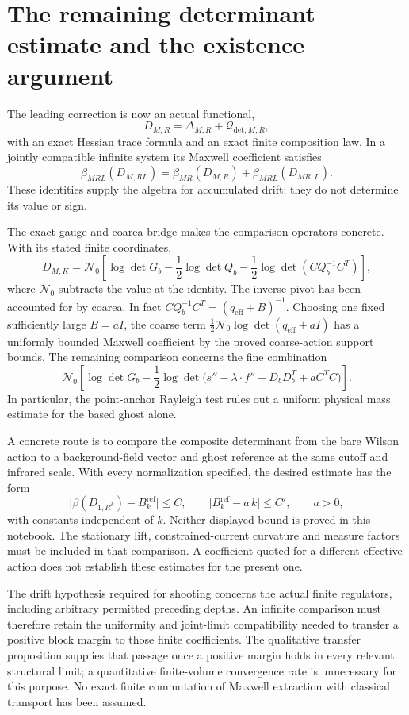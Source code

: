 \section{The remaining determinant estimate and the existence argument}
\label{dfn-next}

The leading correction is now an actual functional,
\[
 D_{M,R}=\Delta_{M,R}+\mathcal Q_{\mathrm{det},M,R},
\]
with an exact Hessian trace formula and an exact finite
composition law. In a jointly compatible infinite system its
Maxwell coefficient satisfies
\[
 \beta_{MRL}(D_{M,RL})
   =\beta_{MR}(D_{M,R})+\beta_{MRL}(D_{MR,L}).
\]
These identities supply the algebra for accumulated drift;
they do not determine its value or sign.

The exact gauge and coarea bridge makes the comparison
operators concrete. With its stated finite coordinates,
\[
 D_{M,K}=\mathcal N_0\!\left[
    \log\det G_b-\frac12\log\det Q_b
                 -\frac12\log\det(CQ_b^{-1}C^T)\right],
\]
where \(\mathcal N_0\) subtracts the value at the identity.
The inverse pivot has been accounted for by coarea.
In fact \(CQ_b^{-1}C^T=(q_{\mathrm{eff}}+B)^{-1}\).
Choosing one fixed sufficiently large \(B=aI\), the
coarse term \(\tfrac12\mathcal N_0\log\det(q_{\mathrm{eff}}+aI)\)
has a uniformly bounded Maxwell coefficient by the
proved coarse-action support bounds.
The remaining comparison concerns the fine combination
\[
 \mathcal N_0\!\left[
 \log\det G_b-\frac12\log\det
 \bigl(s''-\lambda\cdot f''+D_bD_b^T+aC^TC\bigr)\right].
\]
In particular, the point-anchor Rayleigh test rules out a
uniform physical mass estimate for the based ghost alone.

A concrete route is to compare the composite determinant from
the bare Wilson action to a background-field vector and ghost
reference at the same cutoff and infrared scale. With every
normalization specified, the desired estimate has the form
\[
 \bigl|\beta(D_{1,R^k})-B_k^{\mathrm{ref}}\bigr|\le C,
 \qquad
 \bigl|B_k^{\mathrm{ref}}-a\,k\bigr|\le C',
 \qquad a>0,
\]
with constants independent of \(k\). Neither displayed bound is
proved in this notebook. The stationary lift, constrained-current
curvature and measure factors must be included in that comparison.
A coefficient quoted for a different effective action does not
establish these estimates for the present one.

The drift hypothesis required for shooting concerns the actual
finite regulators, including arbitrary permitted preceding depths.
An infinite comparison must therefore retain the uniformity and
joint-limit compatibility needed to transfer a positive block
margin to those finite coefficients. The qualitative transfer
proposition supplies that passage once a positive margin holds
in every relevant structural limit; a quantitative
finite-volume convergence rate is unnecessary for this purpose.
No exact finite commutation of Maxwell extraction with classical
transport has been assumed.

